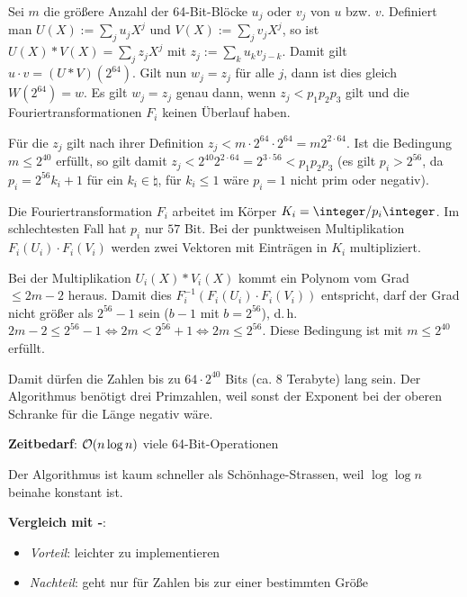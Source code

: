\begin{Beweis}
    Sei $m$ die größere Anzahl der 64-Bit-Blöcke $u_j$ oder $v_j$ von $u$ bzw. $v$.
    Definiert man $U(X) := \sum_j u_j X^j$ und $V(X) := \sum_j v_j X^j$, so ist
    $U(X) \ast V(X) = \sum_j z_j X^j$ mit $z_j := \sum_k u_k v_{j-k}$.
    Damit gilt $u \cdot v = (U \ast V)(2^{64})$.
    Gilt nun $w_j = z_j$ für alle $j$, dann ist dies gleich $W(2^{64}) = w$.
    Es gilt $w_j = z_j$ genau dann, wenn $z_j < p_1 p_2 p_3$ gilt
    und die Fouriertransformationen $F_i$
    keinen Überlauf haben.
    
    Für die $z_j$ gilt nach ihrer Definition
    $z_j < m \cdot 2^{64} \cdot 2^{64} = m 2^{2 \cdot 64}$.
    Ist die Bedingung $m \le 2^{40}$ erfüllt, so gilt damit
    $z_j < 2^{40} 2^{2 \cdot 64} = 2^{3 \cdot 56} < p_1 p_2 p_3$
    (es gilt $p_i > 2^{56}$, da $p_i = 2^{56} k_i + 1$ für ein $k_i \in \natural$,
    für $k_i \le 1$ wäre $p_i = 1$ nicht prim oder negativ).
    
    Die Fouriertransformation $F_i$ arbeitet im Körper $K_i = \integer/p_i\integer$.
    Im schlechtesten Fall hat $p_i$ nur $57$ Bit.
    Bei der punktweisen Multiplikation $F_i(U_i) \cdot F_i(V_i)$ werden zwei Vektoren
    mit Einträgen in $K_i$ multipliziert.
    
    Bei der Multiplikation $U_i(X) \ast V_i(X)$ kommt ein Polynom vom Grad $\le 2m - 2$ heraus.
    Damit dies $F_i^{-1}(F_i(U_i) \cdot F_i(V_i))$ entspricht, darf der Grad nicht größer als
    $2^{56} - 1$ sein ($b - 1$ mit $b = 2^{56}$),
    d.\,h. $2m - 2 \le 2^{56} - 1 \iff 2m < 2^{56} + 1 \iff 2m \le 2^{56}$.
    Diese Bedingung ist mit $m \le 2^{40}$ erfüllt.
\end{Beweis}

Damit dürfen die Zahlen bis zu $64 \cdot 2^{40}$ Bits (ca. $8$ Terabyte) lang sein.
Der Algorithmus benötigt drei Primzahlen, weil sonst der Exponent bei der oberen Schranke für
die Länge negativ wäre.

\textbf{Zeitbedarf}:
$\mathcal{O}(n \log n)$ viele 64-Bit-Operationen

Der Algorithmus ist kaum schneller als Schönhage-Strassen, weil $\log \log n$ beinahe
konstant ist.

\linie

\textbf{Vergleich mit -}:
\begin{itemize}
    \item
    \emph{Vorteil}:
    leichter zu implementieren
    
    \item
    \emph{Nachteil}:
    geht nur für Zahlen bis zur einer bestimmten Größe
\end{itemize}

\pagebreak
